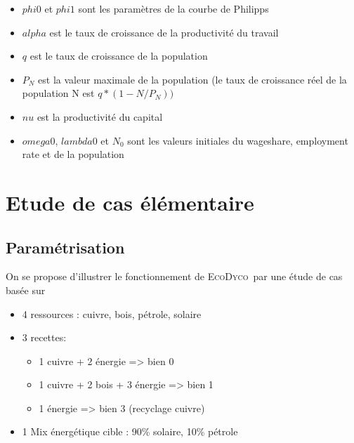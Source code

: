 \documentclass[12pt,a4paper]{article}%
\newcommand{\ed}{\textsc{EcoDyco}}
\begin{document}
\begin{itemize}
\item $phi0$ et $phi1$ sont les paramètres de la courbe de Philipps

\item $alpha$ est le taux de croissance de la productivité du travail

\item $q$ est le taux de croissance de la population

\item $P_{N}$ est la valeur maximale de la population (le taux de croissance
réel de la population N est $q\ast (1-N/P_{N}))$

\item $nu$ est la productivité du capital

\item $omega0$, $lambda0$ et $N_{0}$ sont les valeurs initiales du wageshare,
employment rate et de la population
\end{itemize}

\newpage

\section{Etude de cas élémentaire}

\subsection{Paramétrisation}

On se propose d'illustrer le fonctionnement de \ed\ par une étude de cas
basée sur 

\begin{itemize}
\item 4 ressources : cuivre, bois, pétrole, solaire

\item  3 recettes: 

\begin{itemize}
\item 1 cuivre + 2 énergie => bien 0

\item 1 cuivre + 2 bois + 3 énergie => bien 1

\item 1 énergie => bien 3 (recyclage cuivre)
\end{itemize}

\item 1 Mix énergétique cible : 90\% solaire, 10\% pétrole
\end{itemize}
\end{document}
